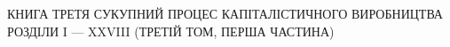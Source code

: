КНИГА ТРЕТЯ
СУКУПНИЙ ПРОЦЕС
КАПІТАЛІСТИЧНОГО ВИРОБНИЦТВА
РОЗДІЛИ I — XXVIII
(ТРЕТІЙ ТОМ, ПЕРША ЧАСТИНА)
